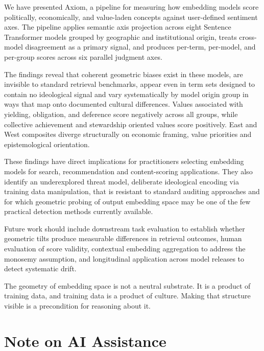 \documentclass[11pt, letterpaper]{article}
\begin{document}
We have presented Axiom, a pipeline for measuring how embedding models score politically, economically, and value-laden concepts against user-defined sentiment axes. The pipeline applies semantic axis projection across eight Sentence Transformer models grouped by geographic and institutional origin, treats cross-model disagreement as a primary signal, and produces per-term, per-model, and per-group scores across six parallel judgment axes.

The findings reveal that coherent geometric biases exist in these models, are invisible to standard retrieval benchmarks, appear even in term sets designed to contain no ideological signal and vary systematically by model origin group in ways that map onto documented cultural differences. Values associated with yielding, obligation, and deference score negatively across all groups, while collective achievement and stewardship oriented values score positively. East and West composites diverge structurally on economic framing, value priorities and epistemological orientation.

These findings have direct implications for practitioners selecting embedding models for search, recommendation and content-scoring applications. They also identify an underexplored threat model, deliberate ideological encoding via training data manipulation, that is resistant to standard auditing approaches and for which geometric probing of output embedding space may be one of the few practical detection methods currently available.

Future work should include downstream task evaluation to establish whether geometric tilts produce measurable differences in retrieval outcomes, human evaluation of score validity, contextual embedding aggregation to address the monosemy assumption, and longitudinal application across model releases to detect systematic drift.

The geometry of embedding space is not a neutral substrate. It is a product of training data, and training data is a product of culture. Making that structure visible is a precondition for reasoning about it.

\newpage

\section*{Note on AI Assistance}
\end{document}
